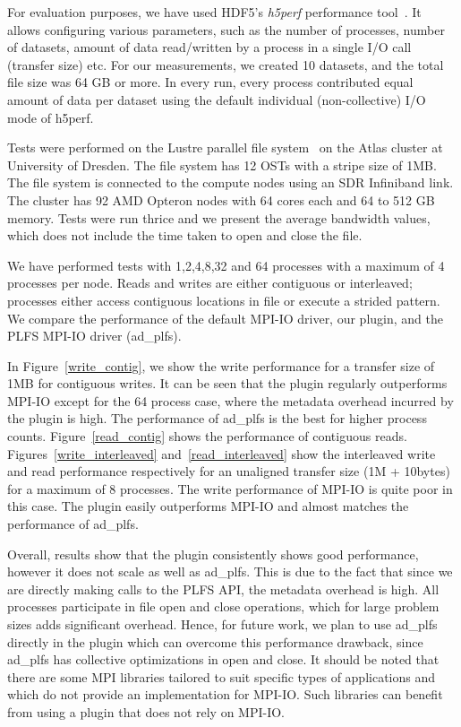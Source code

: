 For evaluation purposes, we have used HDF5's \textit{h5perf} performance tool~\cite{h5perf}. It allows configuring various parameters, such as the number of processes, number of datasets, amount of data read/written by a process in a single I/O call (transfer size) etc. For our measurements, we created 10 datasets, and the total file size was 64 GB or more.
In every run, every process contributed equal amount of data per dataset using the default individual (non-collective) I/O mode of h5perf.

Tests were performed on the Lustre parallel file system~\cite{lustre} on the Atlas cluster at University of Dresden. The file system has 12 OSTs with a stripe size of 1MB. The file system is connected to the compute nodes using an SDR Infiniband link. The cluster has 92 AMD Opteron nodes with 64 cores each and 64 to 512 GB memory. Tests were run thrice and we present the average bandwidth values, which does not include the time taken to open and close the file.

We have performed tests with 1,2,4,8,32 and 64 processes with a maximum of 4 processes per node.
Reads and writes are either contiguous or interleaved; processes either access contiguous locations in file or execute a strided pattern.
We compare the performance of the default MPI-IO driver, our plugin, and the PLFS MPI-IO driver (ad\_plfs). 

In Figure~\ref{write_contig}, we show the write performance for a transfer size of 1MB for contiguous writes. It can be seen that the plugin regularly outperforms MPI-IO except for the 64 process case, where the metadata overhead incurred by the plugin is high. The performance  of ad\_plfs is the best for higher process counts. Figure~\ref{read_contig} shows the performance of contiguous reads. 
Figures~\ref{write_interleaved} and~\ref{read_interleaved} show the interleaved write and read performance respectively for an unaligned transfer size (1M + 10bytes) for a maximum of 8 processes. The write performance of MPI-IO is quite poor in this case. The plugin easily outperforms MPI-IO and almost matches the performance of ad\_plfs. 

Overall, results show that the plugin consistently shows good performance, however it does not scale as well as ad\_plfs. This is due to the fact that since we are directly making calls to the PLFS API, the metadata overhead is high. All processes participate in file open and close operations, which for large problem sizes adds significant overhead. Hence, for future work, we plan to use ad\_plfs directly in the plugin which can overcome this performance drawback, since ad\_plfs has collective optimizations in open and close. It should be noted that there are some MPI libraries tailored to suit specific types of applications and which do not provide an implementation for MPI-IO. Such libraries can benefit from using a plugin that does not rely on MPI-IO. 

